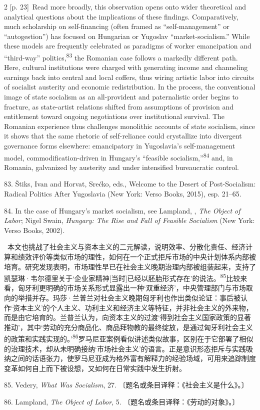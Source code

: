 \documentclass[10pt,a4paper]{article}
\begin{document}
\begin{paracol}{2}
\switchcolumn
{\scriptsize\color{gray} [p. 23]}\ Read more broadly, this observation opens onto wider theoretical and analytical questions about the implications of these findings. Comparatively, much scholarship on self-financing (often framed as “self-management” or “autogestion”) has focused on Hungarian or Yugoslav “market-socialism.” While these models are frequently celebrated as paradigms of worker emancipation and “third-way” politics,\nobreak\textsuperscript{83} the Romanian case follows a markedly different path. Here, cultural institutions were charged with generating income and channeling earnings back into central and local coffers, thus wiring artistic labor into circuits of socialist austerity and economic redistribution. In the process, the conventional image of state socialism as an all-provident and paternalistic order begins to fracture, as state-artist relations shifted from assumptions of provision and entitlement toward ongoing negotiations over institutional survival. The Romanian experience thus challenges monolithic accounts of state socialism, since it shows that the same rhetoric of self-reliance could crystallize into divergent governance forms elsewhere: emancipatory in Yugoslavia’s self-management model, commodification-driven in Hungary’s “feasible socialism,”\nobreak\textsuperscript{84} and, in Romania, galvanized by austerity and under intensified bureaucratic control.\par{\small 83. Štiks, Ivan and Horvat, Srećko, eds., Welcome to the Desert of Post-Socialism: Radical Politics After Yugoslavia (New York: Verso Books, 2015), esp. 21–65.\par}{\small 84. In the case of Hungary’s market socialism, see Lampland, , \textit{The Object of Labor}; Nigel Swain, \textit{Hungary: The Rise and Fall of Feasible Socialism} (New York: Verso Books, 2002).\par}
\switchcolumn*
{\scriptsize\color{gray} [p. 24]}\ 本文也挑战了社会主义与资本主义的二元解读，说明效率、分散化责任、经济计算和绩效评价等类似市场的理性，如何在一个正式拒斥市场的中央计划体系内部被培育。研究发现表明，市场理性早已在社会主义晚期治理内部被组装起来，支持了凯瑟琳·韦尔德里关于‘企业家精神[当时]已经以胚胎形式存在’的说\mbox{法。\textsuperscript{85}}比较来看，匈牙利更明确的市场关系形式显露出一种‘双重经济’，中央管理部门与市场取向的举措并存。玛莎·兰普兰对社会主义晚期匈牙利也作出类似论证：事后被认作‘资本主义’的个人主义、功利主义和经济主义等特征，并非社会主义的外来物，而是由它培育的。兰普兰认为，向资本主义的过渡‘得到社会主义国家政策的显著推动’，其中‘劳动的充分商品化、商品拜物教的最终绽放，是通过匈牙利社会主义的政策和实践实现的。’\nobreak\textsuperscript{86}罗马尼亚案例看似讲述类似故事，区别在于它部署了相似的治理技术，却从未明确接纳‘市场社会主义’的语言。正是意识形态拒斥与实践吸纳之间的话语张力，使罗马尼亚成为格外富有解释力的经验场域，可用来追踪制度变革如何自上而下被设想，又如何在日常实践中发生折射。\par{\small 85. Vedery, \textit{What Was Socialism}, 27. 〔题名或条目译释：《社会主义是什么》。〕\par}{\small 86. Lampland, \textit{The Object of Labor}, 5. 〔题名或条目译释：《劳动的对象》。〕\par}

\end{paracol}
\end{document}
